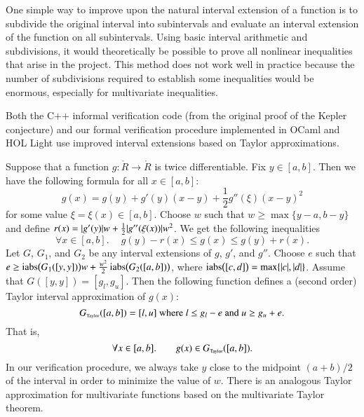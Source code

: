 One simple way to improve upon the natural interval extension of a
function is to subdivide the original interval into subintervals and
evaluate an interval extension of the function on all subintervals.
Using basic interval arithmetic and subdivisions, it would
theoretically be possible to prove all nonlinear inequalities that
arise in the project. This method does not work well in practice
because the number of subdivisions required to establish some
inequalities would be enormous, especially for multivariate
inequalities.

Both the C++ informal verification code (from the original proof of
the Kepler conjecture) and our formal verification procedure
implemented in OCaml and HOL Light use improved interval extensions
based on Taylor approximations.

Suppose that a function $g:\ring{R}\to\ring{R}$ is twice differentiable. Fix $y \in
[a,b]$. Then we have the following formula for all $x \in [a,b]$:
\begin{equation*}
g(x) = g(y) + g'(y)(x - y) + \frac{1}{2}g''(\xi)(x - y)^2
\end{equation*}
for some value $\xi = \xi(x) \in [a,b]$.  Choose $w$ such that $w \ge
\max\{y - a, b - y\}$ and define $r(x) = \lvert g'(y)\rvert w +
\frac{1}{2}\lvert g''(\xi(x))\rvert w^2$. We get the following inequalities
\begin{equation*}
\forall x \in [a,b].\quad\ g(y) - r(x) \le g(x) \le g(y) + r(x).
\end{equation*}
Let $G$, $G_1$, and $G_2$ be any interval extensions of $g$, $g'$, and
$g''$. Choose $e$ such that $e \ge \mathop{\rm iabs}\bigl(G_1([y,y])\bigr)w +
\frac{w^2}{2}\mathop{\rm iabs}\bigl(G_2([a,b])\bigr)$, where
$\mathop{\rm iabs}\bigl([c,d]\bigr) = \max\{\lvert c\rvert, \lvert d\rvert\}$.  Assume that
$G([y,y]) = [g_l,g_u]$. Then the following function defines a (second
order) Taylor interval approximation of $g(x)$:
\begin{equation*}
G_{\hbox{\tiny Taylor}}([a,b]) = [l, u] \text{ where $l \le g_l - e$ and $u \ge g_u + e$}.
\end{equation*}
That is,
\begin{equation*}
\forall x \in [a,b].\quad \quad g(x) \in G_{\hbox{\tiny Taylor}}([a,b]).
\end{equation*}
In our verification procedure, we always take $y$ close to the
midpoint $(a+b)/2$ of the interval in order to minimize the value of
$w$. There is an analogous Taylor approximation for multivariate
functions based on the multivariate Taylor theorem.

